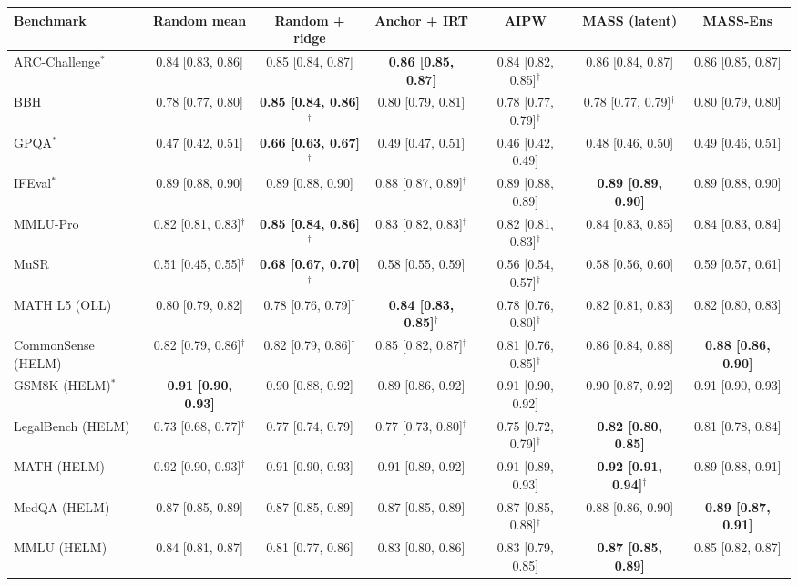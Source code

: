 \begin{tabular}{lcccccc}
\toprule
Benchmark & Random mean & Random + ridge & Anchor + IRT & AIPW & MASS (latent) & MASS-Ens \\
\midrule
ARC-Challenge$^*$ & 0.84 [0.83, 0.86] & 0.85 [0.84, 0.87] & \textbf{0.86 [0.85, 0.87]} & 0.84 [0.82, 0.85]$^\dagger$ & 0.86 [0.84, 0.87] & 0.86 [0.85, 0.87] \\
BBH & 0.78 [0.77, 0.80] & \textbf{0.85 [0.84, 0.86]$^\dagger$} & 0.80 [0.79, 0.81] & 0.78 [0.77, 0.79]$^\dagger$ & 0.78 [0.77, 0.79]$^\dagger$ & 0.80 [0.79, 0.80] \\
GPQA$^*$ & 0.47 [0.42, 0.51] & \textbf{0.66 [0.63, 0.67]$^\dagger$} & 0.49 [0.47, 0.51] & 0.46 [0.42, 0.49] & 0.48 [0.46, 0.50] & 0.49 [0.46, 0.51] \\
IFEval$^*$ & 0.89 [0.88, 0.90] & 0.89 [0.88, 0.90] & 0.88 [0.87, 0.89]$^\dagger$ & 0.89 [0.88, 0.89] & \textbf{0.89 [0.89, 0.90]} & 0.89 [0.88, 0.90] \\
MMLU-Pro & 0.82 [0.81, 0.83]$^\dagger$ & \textbf{0.85 [0.84, 0.86]$^\dagger$} & 0.83 [0.82, 0.83]$^\dagger$ & 0.82 [0.81, 0.83]$^\dagger$ & 0.84 [0.83, 0.85] & 0.84 [0.83, 0.84] \\
MuSR & 0.51 [0.45, 0.55]$^\dagger$ & \textbf{0.68 [0.67, 0.70]$^\dagger$} & 0.58 [0.55, 0.59] & 0.56 [0.54, 0.57]$^\dagger$ & 0.58 [0.56, 0.60] & 0.59 [0.57, 0.61] \\
MATH L5 (OLL) & 0.80 [0.79, 0.82] & 0.78 [0.76, 0.79]$^\dagger$ & \textbf{0.84 [0.83, 0.85]$^\dagger$} & 0.78 [0.76, 0.80]$^\dagger$ & 0.82 [0.81, 0.83] & 0.82 [0.80, 0.83] \\
CommonSense (HELM) & 0.82 [0.79, 0.86]$^\dagger$ & 0.82 [0.79, 0.86]$^\dagger$ & 0.85 [0.82, 0.87]$^\dagger$ & 0.81 [0.76, 0.85]$^\dagger$ & 0.86 [0.84, 0.88] & \textbf{0.88 [0.86, 0.90]} \\
GSM8K (HELM)$^*$ & \textbf{0.91 [0.90, 0.93]} & 0.90 [0.88, 0.92] & 0.89 [0.86, 0.92] & 0.91 [0.90, 0.92] & 0.90 [0.87, 0.92] & 0.91 [0.90, 0.93] \\
LegalBench (HELM) & 0.73 [0.68, 0.77]$^\dagger$ & 0.77 [0.74, 0.79] & 0.77 [0.73, 0.80]$^\dagger$ & 0.75 [0.72, 0.79]$^\dagger$ & \textbf{0.82 [0.80, 0.85]} & 0.81 [0.78, 0.84] \\
MATH (HELM) & 0.92 [0.90, 0.93]$^\dagger$ & 0.91 [0.90, 0.93] & 0.91 [0.89, 0.92] & 0.91 [0.89, 0.93] & \textbf{0.92 [0.91, 0.94]$^\dagger$} & 0.89 [0.88, 0.91] \\
MedQA (HELM) & 0.87 [0.85, 0.89] & 0.87 [0.85, 0.89] & 0.87 [0.85, 0.89] & 0.87 [0.85, 0.88]$^\dagger$ & 0.88 [0.86, 0.90] & \textbf{0.89 [0.87, 0.91]} \\
MMLU (HELM) & 0.84 [0.81, 0.87] & 0.81 [0.77, 0.86] & 0.83 [0.80, 0.86] & 0.83 [0.79, 0.85] & \textbf{0.87 [0.85, 0.89]} & 0.85 [0.82, 0.87] \\
\bottomrule
\end{tabular}
